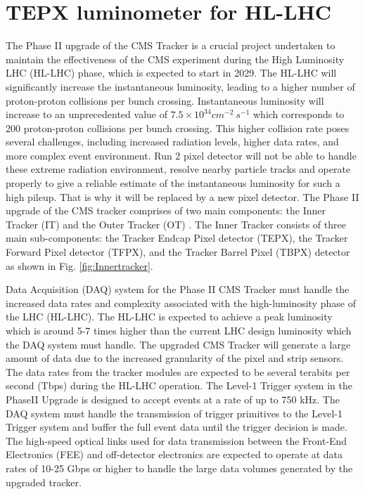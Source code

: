 \chapter{TEPX luminometer for HL-LHC}  %

\ifpdf
    \graphicspath{{Chapter7/Figs/Raster/}{Chapter7/Figs/PDF/}{Chapter7/Figs/}}
\else
    \graphicspath{{Chapter7/Figs/Vector/}{Chapter7/Figs/}}
\fi

The Phase II upgrade of the CMS Tracker is a crucial project undertaken to maintain the effectiveness of the CMS experiment during the High Luminosity LHC (HL-LHC) phase, which is expected to start in 2029. The HL-LHC will significantly increase the instantaneous luminosity, leading to a higher number of proton-proton collisions per bunch crossing. Instantaneous luminosity will increase to an unprecedented value of $7.5 \times 10^{34} cm^{-2} \: s^{-1}$ which corresponds to 200 proton-proton collisions per bunch crossing. This higher collision rate poses several challenges, including increased radiation levels, higher data rates, and more complex event environment. Run 2 pixel detector will not be able to handle these extreme radiation environment, resolve nearby particle tracks and operate properly to give a reliable estimate of the instantaneous luminosity for such a high pileup. That is why it will be replaced by a new pixel detector. The Phase II upgrade of the CMS tracker comprises of two main components: the Inner Tracker (IT) and the Outer Tracker (OT) \cite{collaboration:2759074}. The Inner Tracker consists of three main sub-components: the Tracker Endcap Pixel detector (TEPX), the Tracker Forward Pixel detector (TFPX), and the Tracker Barrel Pixel (TBPX) detector as shown in Fig. \ref{fig:Innertracker}.  %

Data Acquisition (DAQ) system for the Phase II CMS Tracker must handle the increased data rates and complexity associated with the high-luminosity phase of the LHC (HL-LHC). The HL-LHC is expected to achieve a peak luminosity which is around 5-7 times higher than the current LHC design luminosity which the DAQ system must handle. The upgraded CMS Tracker will generate a large amount of data due to the increased granularity of the pixel and strip sensors. The data rates from the tracker modules are expected to be several terabits per second (Tbps) during the HL-LHC operation. The Level-1 Trigger system in the PhaseII Upgrade is designed to accept events at a rate of up to 750 kHz. The DAQ system must handle the transmission of trigger primitives to the Level-1 Trigger system and buffer the full event data until the trigger decision is made. The high-speed optical links used for data transmission between the Front-End Electronics (FEE) and off-detector electronics are expected to operate at data rates of 10-25 Gbps or higher to handle the large data volumes generated by the upgraded tracker.

